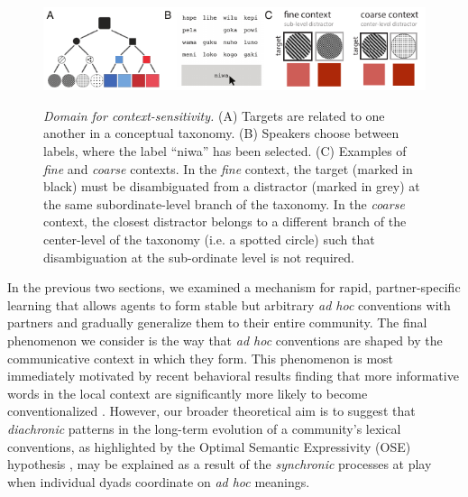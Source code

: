 
\begin{figure}[t]
\begin{center}
{\includegraphics[scale=1.8]{./figures/Sec2-design.pdf}}
{\caption{{\emph{Domain for context-sensitivity.} (A) Targets are related to one another in a conceptual taxonomy. (B) Speakers choose between labels, where the label ``niwa'' has been selected. (C) Examples of \emph{fine} and \emph{coarse} contexts. In the \emph{fine} context, the target (marked in black) must be disambiguated from a distractor (marked in grey) at the same subordinate-level branch of the taxonomy.  In the \emph{coarse} context, the closest distractor belongs to a different branch of the center-level of the taxonomy (i.e. a spotted circle) such that disambiguation at the sub-ordinate level is not required. \label{fig:context_design}}}}
\vspace{-2ex}
\end{center}
\end{figure}

In the previous two sections, we examined a mechanism for rapid, partner-specific learning that allows agents to form stable but arbitrary \emph{ad hoc} conventions with partners and gradually generalize them to their entire community. 
The final phenomenon we consider is the way that \emph{ad hoc} conventions are shaped by the communicative context in which they form.
This phenomenon is most immediately motivated by recent behavioral results finding that more informative words in the local context are significantly more likely to become conventionalized \cite{hawkins2020characterizing}.
However, our broader theoretical aim is to suggest that \emph{diachronic} patterns in the long-term evolution of a community's lexical conventions, as highlighted by the Optimal Semantic Expressivity (OSE) hypothesis \cite{frankblogpost}, may be explained as a result of the \emph{synchronic} processes at play when individual dyads coordinate on  \emph{ad hoc} meanings.

